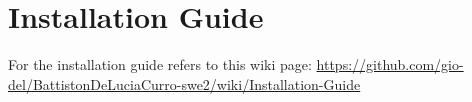 \section{Installation Guide}
For the installation guide refers to this wiki page: \url{https://github.com/gio-del/BattistonDeLuciaCurro-swe2/wiki/Installation-Guide}